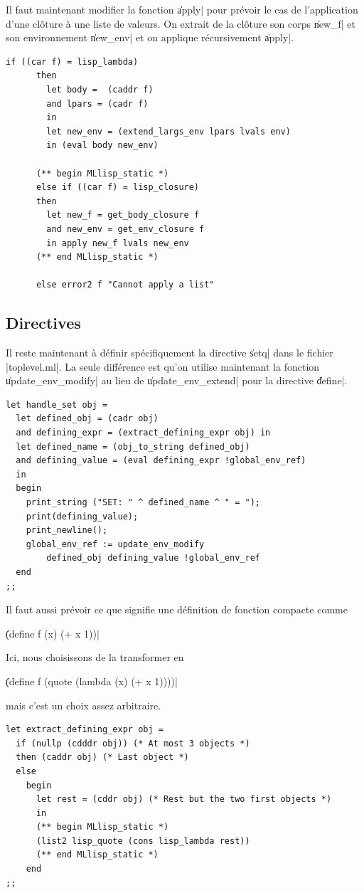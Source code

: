 \documentclass{../../LaTeX/tdsimple}
\begin{document}
Il faut maintenant modifier la fonction \|apply| pour prévoir le cas
de l'application d'une clôture à une liste de valeurs. On extrait de
la clôture son corps \|new_f| et son environnement \|new_env| et on
applique récursivement \|apply|.
\begin{lstlisting}[language=caml]
      if ((car f) = lisp_lambda)
      then
        let body =  (caddr f)
        and lpars = (cadr f)
        in
        let new_env = (extend_largs_env lpars lvals env)
        in (eval body new_env)

      (** begin MLlisp_static *)
      else if ((car f) = lisp_closure)
      then
        let new_f = get_body_closure f
        and new_env = get_env_closure f
        in apply new_f lvals new_env
      (** end MLlisp_static *)

      else error2 f "Cannot apply a list"
\end{lstlisting}

\subsection{Directives}

Il reste maintenant à définir spécifiquement la directive \|setq| dans
le fichier \file|toplevel.ml|. La seule différence est qu'on utilise
maintenant la fonction \|update_env_modify| au lieu de
\|update_env_extend| pour la directive \|define|.
\begin{lstlisting}[language=caml]
let handle_set obj =
  let defined_obj = (cadr obj)
  and defining_expr = (extract_defining_expr obj) in
  let defined_name = (obj_to_string defined_obj)
  and defining_value = (eval defining_expr !global_env_ref)
  in
  begin
    print_string ("SET: " ^ defined_name ^ " = ");
    print(defining_value);
    print_newline();
    global_env_ref := update_env_modify
        defined_obj defining_value !global_env_ref
  end
;;
\end{lstlisting}

Il faut aussi prévoir ce que signifie une définition de fonction
compacte comme
\begin{center}
  \|(define f (x) (+ x 1))|
\end{center}
Ici, nous choisissons de la transformer en %
\begin{center}
  \|(define f (quote (lambda (x) (+ x 1))))|
\end{center}
mais c'est un choix assez arbitraire.
\begin{lstlisting}[language=caml]
let extract_defining_expr obj =
  if (nullp (cdddr obj)) (* At most 3 objects *)
  then (caddr obj) (* Last object *)
  else
    begin
      let rest = (cddr obj) (* Rest but the two first objects *)
      in
      (** begin MLlisp_static *)
      (list2 lisp_quote (cons lisp_lambda rest))
      (** end MLlisp_static *)
    end
;;
\end{lstlisting}
\end{document}
